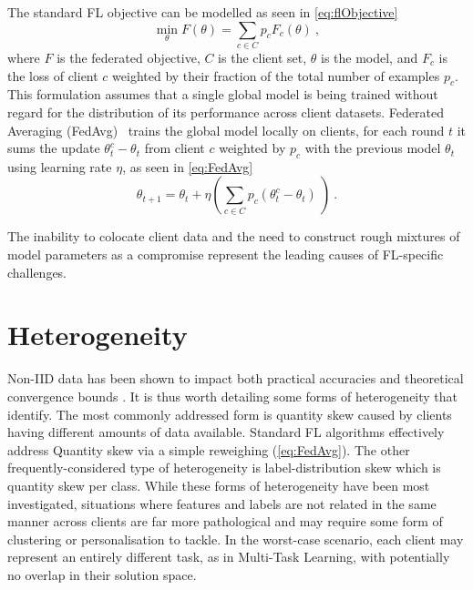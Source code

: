 
The standard FL objective can be modelled as seen in \cref{eq:flObjective}
\begin{equation} \label{eq:flObjective}
    \underset{\theta}{\min} F(\theta) = \sum_{c \in C} p_c F_c(\theta) \ ,
\end{equation}
where \(F\) is the federated objective, $C$ is the client set, $\theta$ is the model, and \(F_c\) is the loss of client \(c\) weighted by their fraction of the total number of examples $p_c$. This formulation assumes that a single global model is being trained without regard for the distribution of its performance across client datasets. Federated Averaging (FedAvg)~\citep{FedAvg} trains the global model locally on clients, for each round $t$ it sums the update \(\theta_t^c - \theta_t\) from client $c$ weighted by \(p_c\) with the previous model \(\theta_t\) using learning rate \( \eta \), as seen in \cref{eq:FedAvg}
\begin{equation} \label{eq:FedAvg}
    \theta_{t+1} = \theta_t + \eta \left( \sum_{c \in C} p_c \left(\theta_t^c - \theta_t \right) \ \right) \ .
\end{equation}

The inability to colocate client data and the need to construct rough mixtures of model parameters as a compromise represent the leading causes of FL-specific challenges.

\section{Heterogeneity}\label{background:data_heterogeneity}

Non-IID data has been shown to impact both practical accuracies \citep{FLwithNonIID, NonIIDQagmire} and theoretical convergence bounds \citep{OnTheConvergenceOfFedAvgOnNonIIDdata}. It is thus worth detailing some forms of heterogeneity that \citet{AdvancedAndOpenProblems} identify. The most commonly addressed form is quantity skew caused by clients having different amounts of data available. Standard FL algorithms effectively address Quantity skew via a simple reweighing (\cref{eq:FedAvg}). The other frequently-considered type of heterogeneity is label-distribution skew which is quantity skew per class. While these forms of heterogeneity have been most investigated, situations where features and labels are not related in the same manner across clients are far more pathological and may require some form of clustering or personalisation to tackle. In the worst-case scenario, each client may represent an entirely different task, as in Multi-Task Learning, with potentially no overlap in their solution space.



